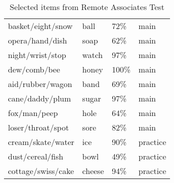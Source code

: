 \begin{table}[h!]
\begin{tabular}{llll}
		basket/eight/snow        & ball     & 72\%                                               & main  		\\ [0.5ex]
		opera/hand/dish          & soap     & 62\%                                               & main    		\\ [0.5ex]
		night/wrist/stop         & watch    & 97\%                                               & main    		\\ [0.5ex]
		dew/comb/bee             & honey    & 100\%                                              & main    		\\ [0.5ex]
		aid/rubber/wagon         & band     & 69\%                                               & main    		\\ [0.5ex]
		cane/daddy/plum          & sugar    & 97\%                                               & main    		\\ [0.5ex]
		fox/man/peep             & hole     & 64\%                                               & main    		\\ [0.5ex]
		loser/throat/spot        & sore     & 82\%                                               & main    		\\ [0.5ex]
		cream/skate/water        & ice      & 90\%                                               & practice     \\ [0.5ex]
		dust/cereal/fish         & bowl     & 49\%                                               & practice     \\ [0.5ex]
		cottage/swiss/cake       & cheese   & 94\%                                               & practice     \\ \hline
	\end{tabular}
	\caption{Selected items from Remote Associates Test \cite{Bowden}}
	\label{table:1}
\end{table}